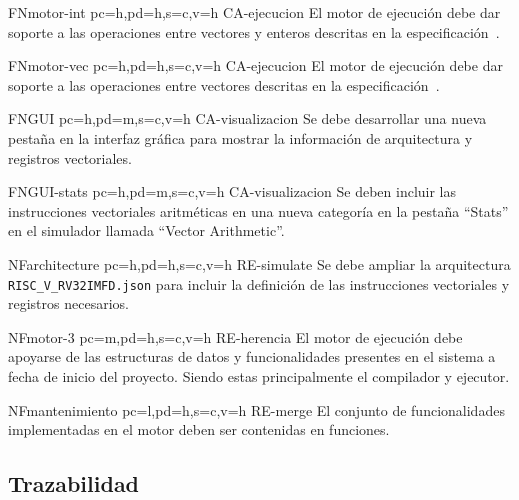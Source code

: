 \begin{softwareReq}{FN}{motor-int}
    {pc=h,pd=h,s=c,v=h}
    {CA-ejecucion}
    El motor de ejecución debe dar soporte a las operaciones entre vectores y enteros descritas en la especificación~\cite{riscv-isa2024}.
\end{softwareReq}

\begin{softwareReq}{FN}{motor-vec}
    {pc=h,pd=h,s=c,v=h}
    {CA-ejecucion}
    El motor de ejecución debe dar soporte a las operaciones entre vectores descritas en la especificación~\cite{riscv-isa2024}.
\end{softwareReq}

\begin{softwareReq}{FN}{GUI}
    {pc=h,pd=m,s=c,v=h}
    {CA-visualizacion}
    Se debe desarrollar una nueva pestaña en la interfaz gráfica para mostrar la información de arquitectura y registros vectoriales.
\end{softwareReq}

\begin{softwareReq}{FN}{GUI-stats}
    {pc=h,pd=m,s=c,v=h}
    {CA-visualizacion}
    Se deben incluir las instrucciones vectoriales aritméticas en una nueva categoría en la pestaña ``Stats'' en el simulador llamada ``Vector Arithmetic''.
\end{softwareReq}

\begin{softwareReq}{NF}{architecture}
    {pc=h,pd=h,s=c,v=h}
    {RE-simulate}
    Se debe ampliar la arquitectura \texttt{RISC\_V\_RV32IMFD.json} para incluir la definición de las instrucciones vectoriales y registros necesarios.
\end{softwareReq}

\begin{softwareReq}{NF}{motor-3}
    {pc=m,pd=h,s=c,v=h}
    {RE-herencia}
    El motor de ejecución debe apoyarse de las estructuras de datos y funcionalidades presentes en el sistema a fecha de inicio del proyecto. Siendo estas principalmente el compilador y ejecutor.
\end{softwareReq}

\begin{softwareReq}{NF}{mantenimiento}
    {pc=l,pd=h,s=c,v=h}
    {RE-merge}
    El conjunto de funcionalidades implementadas en el motor deben ser contenidas en funciones.
\end{softwareReq}


\FloatBarrier

\subsection{Trazabilidad}

